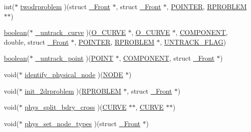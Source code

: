 \begin{DoxyCompactItemize}
\item 
int($\ast$ \hyperlink{struct___front_a077aa1c247c7256e0378e5775f050f75}{twodrproblem} )(struct \hyperlink{struct___front}{\+\_\+\+Front} $\ast$, struct \hyperlink{struct___front}{\+\_\+\+Front} $\ast$, \hyperlink{cdecs_8h_ae51a81000f343b8ec43bca1f6a723d7b}{P\+O\+I\+N\+T\+ER}, \hyperlink{frp_8h_a8e39ec4bf8bcc03a2e164b2ab39b9b33}{R\+P\+R\+O\+B\+L\+EM} $\ast$$\ast$)
\item 
\hyperlink{cdecs_8h_ad048433382a936258fb49e2ec4f148e1}{boolean}($\ast$ \hyperlink{struct___front_a02b142d262b5d29e6d9b74a986a0fc57}{\+\_\+untrack\+\_\+curve} )(\hyperlink{int_8h_adc6df71145271c2a0aa07656d8b23fa8}{O\+\_\+\+C\+U\+R\+VE} $\ast$, \hyperlink{int_8h_adc6df71145271c2a0aa07656d8b23fa8}{O\+\_\+\+C\+U\+R\+VE} $\ast$, \hyperlink{int_8h_a2bb7be12ca59ea6443c8757df0a7c278}{C\+O\+M\+P\+O\+N\+E\+NT}, double, struct \hyperlink{struct___front}{\+\_\+\+Front} $\ast$, \hyperlink{cdecs_8h_ae51a81000f343b8ec43bca1f6a723d7b}{P\+O\+I\+N\+T\+ER}, \hyperlink{frp_8h_a8e39ec4bf8bcc03a2e164b2ab39b9b33}{R\+P\+R\+O\+B\+L\+EM} $\ast$, \hyperlink{fdecs_8h_ad875b8f4082300d448354f95f74eb398}{U\+N\+T\+R\+A\+C\+K\+\_\+\+F\+L\+AG})
\item 
\hyperlink{cdecs_8h_ad048433382a936258fb49e2ec4f148e1}{boolean}($\ast$ \hyperlink{struct___front_a7ae66fc11a5a011e3c13d94b624fa8b9}{\+\_\+untrack\+\_\+point} )(\hyperlink{int_8h_a3a87c5c9d0146e30a4bf720f701e5a63}{P\+O\+I\+NT} $\ast$, \hyperlink{int_8h_a2bb7be12ca59ea6443c8757df0a7c278}{C\+O\+M\+P\+O\+N\+E\+NT}, struct \hyperlink{struct___front}{\+\_\+\+Front} $\ast$)
\item 
void($\ast$ \hyperlink{struct___front_a4f462687303ad04d91d4611927501a36}{identify\+\_\+physical\+\_\+node} )(\hyperlink{int_8h_a65acc517559b106aa8e5fe339247ddcd}{N\+O\+DE} $\ast$)
\item 
void($\ast$ \hyperlink{struct___front_aeb65d347cab5c980f5b384bacd224795}{init\+\_\+2drproblem} )(\hyperlink{frp_8h_a8e39ec4bf8bcc03a2e164b2ab39b9b33}{R\+P\+R\+O\+B\+L\+EM} $\ast$, struct \hyperlink{struct___front}{\+\_\+\+Front} $\ast$)
\item 
void($\ast$ \hyperlink{struct___front_ab6b4cfd6332901dd84b070c2f852e922}{phys\+\_\+split\+\_\+bdry\+\_\+cross} )(\hyperlink{int_8h_a4c1c272bef898dbaa20b055af85cd685}{C\+U\+R\+VE} $\ast$$\ast$, \hyperlink{int_8h_a4c1c272bef898dbaa20b055af85cd685}{C\+U\+R\+VE} $\ast$$\ast$)
\item 
void($\ast$ \hyperlink{struct___front_a6002b2ae094d22bdd97a32093ef27bbf}{phys\+\_\+set\+\_\+node\+\_\+types} )(struct \hyperlink{struct___front}{\+\_\+\+Front} $\ast$)
$$
\end{DoxyCompactItemize}
